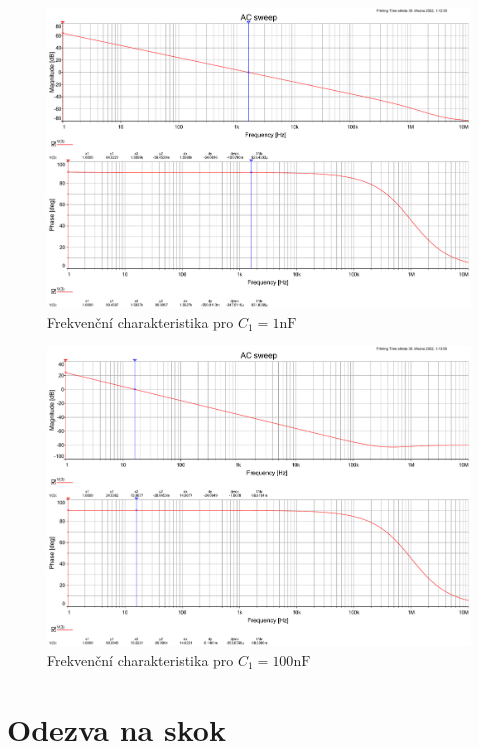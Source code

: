 \documentclass[twoside]{article}
\begin{document}
\newpage
\begin{figure}[h!]
    \centering
    \includegraphics[width=0.92\linewidth]{bode_1.pdf}
    \caption{Frekvenční charakteristika pro $C_1 = 1 \si{\nano\farad}$}
    \label{fig:bode_1}
\end{figure}

\begin{figure}[h!]
    \centering
    \includegraphics[width=0.92\linewidth]{bode_100.pdf}
    \caption{Frekvenční charakteristika pro $C_1 = 100 \si{\nano\farad}$}
    \label{fig:bode_100}
\end{figure}

\newpage
\section{Odezva na skok}
\end{document}
